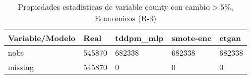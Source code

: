 \begin{table}[H]
\centering
\fontsize{8}{14}\selectfont
\caption{Propiedades estadisticas de variable county con cambio\ensuremath{>}5\%, Economicos (B-3)}
\label{table-stats-economicos-b-3-county-short}
\begin{tabular}{|l|m{10em}|m{10em}|m{10em}|m{10em}|}
\hline
 \rowcolor[gray]{0.8}
Variable/Modelo & Real & tddpm\_mlp & smote-enc & ctgan \\
\hline nobs & 545870 & 682338 & 682338 & 682338 \\
\hline missing & 545870 & 0 & 0 & 0 \\
\hline
\end{tabular}
\end{table}
